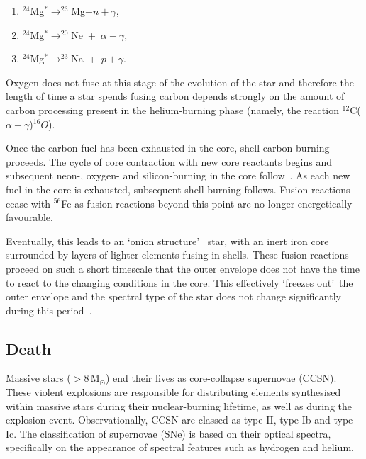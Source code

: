 \begin{enumerate}
    \item $^{24}$Mg$^{*}\rightarrow ^{23}$Mg$+n+\gamma$,
    \item $^{24}$Mg$^{*}\rightarrow ^{20}$Ne~+~$\alpha+\gamma$,
    \item $^{24}$Mg$^{*}\rightarrow ^{23}$Na~+~$p+\gamma$.
\end{enumerate}

Oxygen does not fuse at this stage of the evolution of the star and therefore the length of time a star spends fusing carbon depends strongly on the amount of carbon processing present in the helium-burning phase (namely, the reaction $^{12}$C($\alpha+\gamma$)$^{16}O$).

Once the carbon fuel has been exhausted in the core, shell carbon-burning proceeds.
The cycle of core contraction with new core reactants begins and subsequent neon-, oxygen- and silicon-burning in the core follow~\citep{Woosley02}.
As each new fuel in the core is exhausted, subsequent shell burning follows.
Fusion reactions cease with $^{56}$Fe as fusion reactions beyond this point are no longer energetically favourable.

Eventually, this leads to an \textquoteleft onion structure\textquoteright
~star, with an inert iron core surrounded by layers of lighter elements fusing in shells.
These fusion reactions proceed on such a short timescale that the outer envelope does not have the time to react to the changing conditions in the core.
This effectively \textquoteleft freezes out\textquoteright ~the outer envelope and the spectral type of the star does not change significantly during this period~\citep{Meynet11}.


\subsection{Death} %
\label{sub:death}

Massive stars ($>$8\,M$_{\odot}$) end their lives as core-collapse supernovae (CCSN).
These violent explosions are responsible for distributing elements synthesised within massive stars during their nuclear-burning lifetime, as well as during the explosion event.
Observationally, CCSN are classed as type II, type Ib and type Ic.\footnotemark
{}
The classification of supernovae (SNe) is based on their optical spectra, specifically on the appearance of spectral features such as hydrogen and helium.

